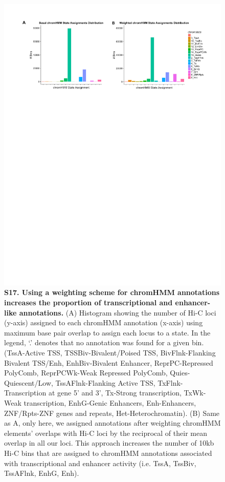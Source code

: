 \begin{figure}[!htb]
\centering
\includegraphics[width=6in]{img/figS17.pdf}
\caption[Using a weighting scheme for chromHMM annotations increases the proportion of transcriptional and enhancer-like annotations.]{\textbf{S17. Using a weighting scheme for chromHMM annotations increases the proportion of transcriptional and enhancer-like annotations.} (A) Histogram showing the number of Hi-C loci (y-axis) assigned to each chromHMM annotation (x-axis) using maximum base pair overlap to assign each locus to a state. In the legend, `.' denotes that no annotation was found for a given bin. (TssA-Active TSS, TSSBiv-Bivalent/Poised TSS, BivFlnk-Flanking Bivalent TSS/Enh, EnhBiv-Bivalent Enhancer, ReprPC-Repressed PolyComb, ReprPCWk-Weak Repressed PolyComb, Quies-Quiescent/Low, TssAFlnk-Flanking Active TSS, TxFlnk-Transcription at gene 5' and 3', Tx-Strong transcription, TxWk-Weak transcription, EnhG-Genic Enhancers, Enh-Enhancers, ZNF/Rpts-ZNF genes and repeats, Het-Heterochromatin). (B) Same as A, only here, we assigned annotations after weighting chromHMM elements' overlaps with Hi-C loci by the reciprocal of their mean overlap in all our loci. This approach increases the number of 10kb Hi-C bins that are assigned to chromHMM annotations associated with transcriptional and enhancer activity (i.e. TssA, TssBiv, TssAFlnk, EnhG, Enh).}
\label{fig:figS17}
\end{figure}

